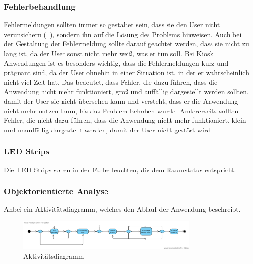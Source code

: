 \subsubsection{Fehlerbehandlung}\label{subsubsec:fehlerbehandlung}
Fehlermeldungen sollten immer so gestaltet sein, dass sie den User nicht verunsichern (~\cite{interaction-design-book1}), sondern ihn auf die Lösung des Problems hinweisen.
Auch bei der Gestaltung der Fehlermeldung sollte darauf geachtet werden, dass sie nicht zu lang ist, da der User sonst nicht mehr weiß, was er tun soll.
Bei Kiosk Anwendungen ist es besonders wichtig, dass die Fehlermeldungen kurz und prägnant sind, da der User ohnehin in einer Situation ist, in der er wahrscheinlich nicht viel Zeit hat.
Das bedeutet, dass Fehler, die dazu führen, dass die Anwendung nicht mehr funktioniert, groß und auffällig dargestellt werden sollten, damit der User sie nicht übersehen kann und versteht, dass er die Anwendung nicht mehr nutzen kann, bis das Problem behoben wurde.
Andererseits sollten Fehler, die nicht dazu führen, dass die Anwendung nicht mehr funktioniert, klein und unauffällig dargestellt werden, damit der User nicht gestört wird.
\subsubsection{LED Strips}\label{subsubsec:led-strips}
Die~\gls{LED Strips} sollen in der Farbe leuchten, die dem Raumstatus entspricht.
\subsubsection{Objektorientierte Analyse}\label{subsubsec:objektorientierte-analyse}
Anbei ein Aktivitätsdiagramm, welches den Ablauf der Anwendung beschreibt.
\par\vspace{1cm}
\begin{figure}[h]
\centering
\includegraphics[width=0.8\textwidth]{Bilder/Objektorientierte Analyse/Ressource booking activity diagramm}
\caption{Aktivitätsdiagramm}
\label{fig:Aktivitätsdiagramm}
\end{figure}
\par\vspace{1cm}
\justifying
\newline
